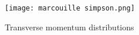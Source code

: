 \documentclass{article}
\begin{document}




\begin{figure}[htp]
\centering
\texttt{[image: marcouille simpson.png]}
\caption{Transverse momentum distributions}\label{fig:marcouille simpson.png}
\end{figure}

\end{document}
